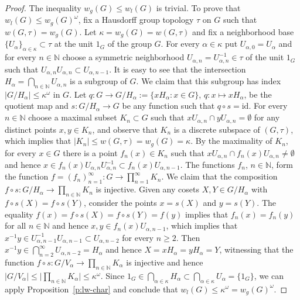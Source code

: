 \documentclass[11pt, twoside]{amsart}
\theoremstyle{definition}
\begin{document}
\begin{proof} The inequality $w_g(G)\le w_l(G)$ is trivial. To prove that $w_l(G)\le w_g(G)^{\omega}$, fix a Hausdorff group topology $\tau$ on $G$ such that $w(G,\tau)=w_g(G)$. Let $\kappa=w_g(G)=w(G,\tau)$ and fix a neighborhood base $\{U_\alpha\}_{\alpha\in \kappa}\subset\tau$ at the unit $1_G$ of the group $G$. For every $\alpha\in\kappa$ put $U_{\alpha,0}=U_{\alpha}$ and for every $n\in{\mathbb N}$ choose a symmetric neighborhood $U_{\alpha,n}=U_{\alpha,n}^{-1}\in\tau$ of the unit $1_G$ such that $U_{\alpha,n}U_{\alpha,n}\subset U_{\alpha,n-1}$. It is easy to see that the intersection $H_{\alpha}=\bigcap_{n\in{\mathbb N}}U_{\alpha,n}$ is a subgroup of $G$. We claim that this subgroup has index $|G/H_\alpha|\le \kappa^{\omega}$ in $G$. Let $q:G\to G/H_{\alpha}:=\{xH_\alpha:x\in G\}$, $q:x\mapsto xH_\alpha$, be the quotient map and $s:G/H_{\alpha}\to G$ be any function such that $q\circ s={\mathrm{id}}$. For every $n\in{\mathbb N}$ choose a maximal subset $K_n\subset G$ such that $xU_{\alpha,n}\cap yU_{\alpha,n}=\emptyset$ for any distinct points $x,y\in K_n$, and observe that $K_n$ is a discrete subspace of $(G,\tau)$, which implies that $|K_n|\le w(G,\tau)=w_g(G)=\kappa$. By the maximality of $K_n$, for every $x\in G$ there is a point $f_n(x)\in K_n$ such that $xU_{\alpha,n}\cap f_n(x)U_{\alpha,n}\ne\emptyset$ and hence $x\in f_n(x)U_{\alpha,n}U_{\alpha,n}^{-1}\subset f_n(x)U_{\alpha,n-1}$. The functions $f_n$, $n\in{\mathbb N}$, form the function $f=(f_n)_{n=1}^\infty:G\to\prod_{n=1}^\infty K_n$. We claim that the composition $f\circ s:G/H_{\alpha}\to \prod_{n\in{\mathbb N}}K_n$ is injective. Given any cosets $X,Y\in G/H_\alpha$ with $f\circ s(X)=f\circ s(Y)$, consider the points $x=s(X)$ and $y=s(Y)$. The equality $f(x)=f\circ s(X)=f\circ s(Y)=f(y)$ implies that $f_n(x)=f_n(y)$ for all $n\in{\mathbb N}$ and hence $x,y\in f_n(x)U_{\alpha,n-1}$, which implies that $x^{-1}y\in U^{-1}_{\alpha,n-1}U_{\alpha,n-1}\subset U_{\alpha,n-2}$ for every $n\ge 2$. Then $x^{-1}y\in\bigcap_{n=2}^\infty U_{\alpha,n-2}=H_\alpha$ and hence $X=xH_\alpha=yH_\alpha=Y$, witnessing that the function $f\circ s:G/V_{\alpha}\to\prod_{n\in{\mathbb N}}K_\alpha$ is injective and hence
$|G/V_{\alpha}|\le\big|\prod_{n\in{\mathbb N}}K_\alpha\big|\le\kappa^{\omega}$.
Since $1_G\in\bigcap_{\alpha\in\kappa}H_\alpha\subset\bigcap_{\alpha\in\kappa}U_\alpha=\{1_G\}$, we can apply Proposition~\ref{p:lw-char} and conclude that $w_l(G)\le\kappa^{\omega}=w_g(G)^{\omega}$.
\end{proof}
\end{document}
